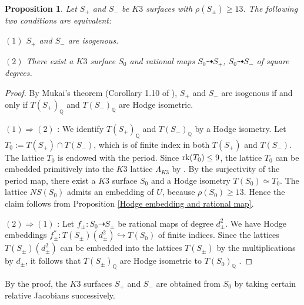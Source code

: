 \documentclass{article}
\theoremstyle{plain}
\newtheorem{proposition}[theorem]{Proposition}%
\theoremstyle{definition}
\theoremstyle{remark}
\newcommand{\Q}{{\mathbb Q}}
\begin{document}
\begin{proposition}\label{isogenous}
Let $S_{+}$ and $S_{-}$ be $K3$ surfaces with 
$\rho (S_{\pm}) \geq 13$. 
The following two conditions are equivalent: 

$(1)$ 
$S_{+}$ and $S_{-}$ are isogenous. 

$(2)$ 
There exist a $K3$ surface $S_{0}$ and 
rational maps $S_{0} \dashrightarrow S_{+}$,  $S_{0} \dashrightarrow S_{-}$ of square degrees.
\end{proposition}












\begin{proof} 
By Mukai's theorem (Corollary 1.10 of \cite{Mu}), 
$S_{+}$ and $S_{-}$ are isogenous 
if and only if 
$T(S_{+})_{{\Q}}$ and $T(S_{-})_{{\Q}}$ are Hodge isometric. 





$(1) \Rightarrow (2)$ : 
We identify $T(S_{+})_{{\Q}}$ and $T(S_{-})_{{\Q}}$ by a Hodge isometry. 
Let $T_{0} := T(S_{+}) \cap T(S_{-})$, 
which is of finite index in both $T(S_{+})$ and $T(S_{-})$. 
The lattice $T_{0}$ is endowed with the period. 
Since ${\rm rk\/}(T_{0}) \leq 9$, 
the lattice $T_{0}$ can be embedded primitively into 
the $K3$ lattice $\Lambda _{K3}$ by \cite{Ni}. 
By the surjectivity of the period map, 
there exist a $K3$ surface $S_{0}$ and 
a Hodge isometry $T(S_{0}) \simeq T_{0}$. 
The lattice $NS(S_{0})$ admits an embedding of $U$, 
because $\rho (S_{0}) \geq 13$. 
Hence the claim follows from Proposition \ref{Hodge embedding and rational map}. 




$(2) \Rightarrow (1)$ : 
Let $f_{\pm} : S_{0} \dashrightarrow S_{\pm}$ 
be rational maps of degree $d_{\pm}^{2}$. 
We have Hodge embeddings 
$f_{\pm}^{\ast} : T(S_{\pm})(d_{\pm}^{2}) \hookrightarrow T(S_{0})$ 
of finite indices. 
Since 
the lattices $T(S_{\pm})(d_{\pm}^{2})$ 
can be embedded into 
the lattices $T(S_{\pm})$ 
by the multiplications by $d_{\pm}$, 
it follows that 
$T(S_{\pm})_{{\Q}}$ are Hodge isometric to $T(S_{0})_{{\Q}}$ .
\end{proof}




By the proof, 
the $K3$ surfaces $S_{+}$ and $S_{-}$ 
are obtained from $S_{0}$ 
by taking certain relative Jacobians successively. 
\end{document}
